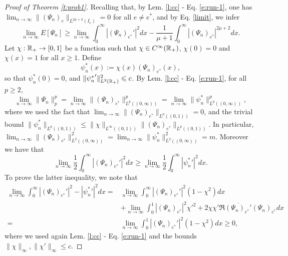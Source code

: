 {\begin{proof}[Proof of Theorem \ref{t:prob1}]
Recalling that, by Lem. \ref{l:cc} - Eq. \eqref{e:run-1}, one has $\lim_{n\to\infty}\|(\Psi_n)_e\|_{L^{2\mu+2}(I_e)} =0$ for all $e\neq e^*$, and by Eq. \eqref{limit}, we infer 
 \begin{equation}
 \label{little}
 \lim_{n\to \infty} E[\Psi_n]  \geq \lim_{n\to\infty }  \int_0^\infty |(\Psi_n)_{e^*}'|^2 dx -\frac{1}{\mu+1} \int_0^\infty  |(\Psi_n)_{e^*}|^{2\mu+2} dx.
 \end{equation}
 Let  $\chi:\mathbb R_+ \to [0,1]$ be a  function such that $\chi \in C^\infty(\mathbb R_+)$, $\chi(0) = 0$ and $\chi(x)=1$ for all $x\geq 1$.  Define 
\[\psi_n^*(x) :=  \chi(x)(\Psi_n)_{e^*}(x) , \]
so that $\psi_n^*(0)= 0$, and ${\|\psi_n^*}'\|_{L^2(\mathbb R_+)}^2 \leqslant c$. By Lem. \ref{l:cc} - Eq. \eqref{e:run-1}, for all $p\geq 2$,
\begin{equation}\label{psinstar1}
\lim_{n\to\infty} \|\Psi_n\|_p^p = \lim_{n\to\infty} \|(\Psi_n)_{e^*}\|_{L^p((0,\infty))}^p = \lim_{n\to\infty} \|\psi_n^*\|_{L^p((0,\infty))}^p,
\end{equation}
where we used the fact that $\lim_{n\to\infty} \|(\Psi_n)_{e^*}\|_{L^p((0,1))} = 0  $, and the trivial bound $ \|\psi_n^*\|_{L^p((0,1))} \leq  \|\chi\|_{L^\infty((0,1))} \|(\Psi_n)_{e^*}\|_{L^p((0,1))}$.  In particular, $ \lim_{n\to\infty} \|(\Psi_n)_{e^*}\|_{L^2((0,\infty))}^2 = \lim_{n\to\infty} \|\psi_n^*\|_{L^2((0,\infty))}^2 = m$. 
Moreover we have that 
 \begin{equation}\label{psinstar2}
  \lim_{n\to\infty } \frac12 \int_0^\infty |(\Psi_n)_{e^*}'|^2 dx \geq   \lim_{n\to\infty } \frac12 \int_0^\infty |{\psi_n^*}'|^2 dx. 
\end{equation}
 To prove the latter inequality, we note that 
\[\begin{aligned}
 \lim_{n\to\infty } \int_0^\infty |(\Psi_n)_{e^*}'|^2 - |{\psi_n^*}'|^2 dx 
 =&   
 \lim_{n\to\infty } \int_0^\infty |(\Psi_n)_{e^*}'|^2\left(1-\chi^{2}\right)  dx  \\ 
 & +
 \lim_{n\to\infty } \int_0^1 |(\Psi_n)_{e^*}|^2 {\chi'}^{2} + 2\chi {\chi'} \Re \overline {(\Psi_n)_{e^*}'}(\Psi_n)_{e^*} dx \\
 = &   \lim_{n\to\infty } \int_0^1 |(\Psi_n)_{e^*}'|^2\left(1- \chi^{2}\right)  dx  \geq 0 ,
\end{aligned}\]
where we used again Lem. \ref{l:cc} - Eq. \eqref{e:run-1} and the bounds $\|\chi\|_\infty, \|\chi'\|_\infty\leq c $. 


\end{proof}}
